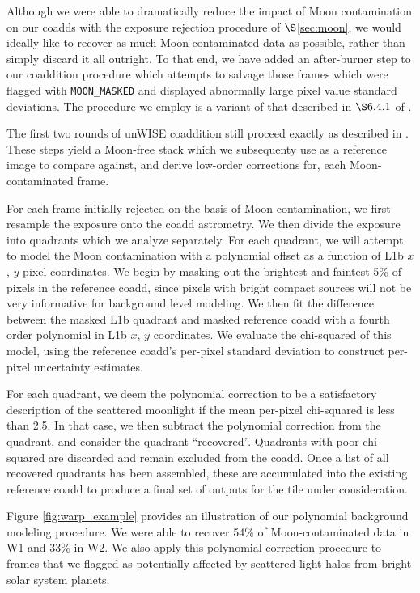 \documentclass{emulateapj}
\begin{document}
Although we were able to dramatically reduce the impact of Moon contamination
on our coadds with the exposure rejection procedure of $\S$\ref{sec:moon},
we would ideally like to recover as much Moon-contaminated data as possible,
rather than simply discard it all outright. To that end, we have added an 
after-burner step to our coaddition procedure which attempts to salvage those 
frames which were flagged with \verb|MOON_MASKED| and displayed abnormally 
large pixel value standard deviations. The procedure we employ is a variant of 
that described in $\S6.4.1$ of \cite{meisner14}.

The first two rounds of unWISE coaddition still proceed exactly as 
described in \cite{lang14}. These steps yield a Moon-free stack which we 
subsequenty use as a reference image to compare against, and derive low-order 
corrections for, each Moon-contaminated frame.

For each frame initially rejected on the basis of Moon contamination, we 
first resample the exposure onto the coadd astrometry. We then divide
the exposure into quadrants which we analyze separately. For each quadrant,
we will attempt to model the Moon contamination with a polynomial 
offset as a function of L1b $x$, $y$ pixel coordinates. We begin by masking out 
the brightest and faintest 5\% of pixels in the reference coadd, since pixels
with bright compact sources will not be very informative for background level
modeling. We then fit the difference between the masked L1b quadrant and masked
reference coadd with a fourth order polynomial in L1b $x$, $y$ coordinates. We 
evaluate the chi-squared of this model, using the reference coadd's per-pixel
standard deviation to construct per-pixel uncertainty estimates.

For each quadrant, we deem the polynomial correction to be a satisfactory 
description of the scattered moonlight if the mean per-pixel chi-squared is 
less than 2.5. In that case, we then subtract the polynomial correction from 
the quadrant, and consider the quadrant ``recovered''. Quadrants with poor 
chi-squared are discarded and remain excluded from the coadd. Once a list of 
all recovered quadrants has been assembled, these are accumulated into the 
existing reference coadd to produce a final set of outputs for the tile under 
consideration.

Figure \ref{fig:warp_example} provides an illustration of our polynomial 
background modeling procedure. We were able to recover 54\% of 
Moon-contaminated data in W1 and 33\% in W2. We also apply this polynomial
correction procedure to frames that we flagged as potentially affected
by scattered light halos from bright solar system planets.
\end{document}
